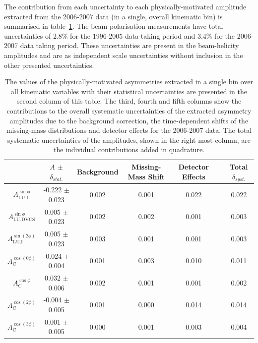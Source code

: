 \documentclass[11pt,a4paper]{article}
\begin{document}
The contribution from each uncertainty to each physically-motivated amplitude extracted from the 2006-2007 data (in a single, overall kinematic bin) is summarised in table~\ref{table_systematic_contributions_0607}. The beam polarisation measurements have total uncertainties of 2.8\% for the 1996-2005 data-taking period and 3.4\% for the 2006-2007 data taking period. These uncertainties are present in the beam-helicity amplitudes and are as independent scale uncertainties without inclusion in the other presented uncertainties.
\begin{table}
 \begin{center}
\resizebox{\textwidth}{!} {
 \begin{tabular}{|c|c||c|c|c|c|c|}
  \hline
 & $A$ $\pm$ $\delta_{stat.}$& Background & Missing-Mass Shift  & Detector Effects & & Total $\delta_{syst.}$ \\
  \hline
  \hline
  $A_{\textrm{LU,I}}^{\sin\phi}$ & -0.222  $\pm$  0.023  & 0.002 & 0.001 & 0.022 & & 0.022 \\
  \hline
  $A_{\textrm{LU,DVCS}}^{\sin\phi}$ & 0.005  $\pm$  0.023  & 0.002 & 0.002 & 0.001 & & 0.003 \\
  \hline
  $A_{\textrm{LU,I}}^{\sin(2\phi)}$ & 0.005  $\pm$  0.023  & 0.003 & 0.001 & 0.001 & & 0.003 \\
  \hline
  \hline
  $A_{\textrm{C}}^{\cos(0\phi)}$ & -0.024 $\pm$  0.004 & 0.001 & 0.003 & 0.010 & & 0.011 \\
  \hline
  $A_{\textrm{C}}^{\cos\phi}$ & 0.032  $\pm$  0.006 & 0.002 & 0.001 & 0.001 & & 0.002 \\
  \hline
  $A_{\textrm{C}}^{\cos(2\phi)}$ & -0.004  $\pm$  0.005 & 0.001 & 0.000 & 0.014 & & 0.014 \\
  \hline
  $A_{\textrm{C}}^{\cos(3\phi)}$ & 0.001  $\pm$   0.005 & 0.000 & 0.001 & 0.003 & & 0.004 \\
  \hline
 \end{tabular}
}
  \caption{The values of the physically-motivated asymmetries extracted in a single bin over all kinematic variables with their statistical uncertainties are presented in the second column of this table. The third, fourth and fifth columns show the contributions to the overall systematic uncertainties of the extracted asymmetry amplitudes due to the background correction, the time-dependent shifts of the missing-mass distributions and detector effects for the 2006-2007 data. The total
systematic uncertainties of the amplitudes, shown in the right-most column, are the individual contributions added in quadrature.}
  \label{table_systematic_contributions_0607}
\end{center}
\end{table}
\end{document}
